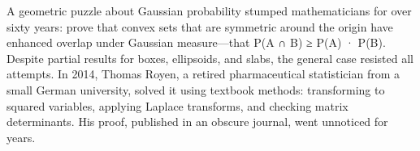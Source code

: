 A geometric puzzle about Gaussian probability stumped mathematicians for over sixty years: prove that convex sets that are symmetric around the origin have enhanced overlap under Gaussian measure—that P(A ∩ B) ≥ P(A) · P(B). Despite partial results for boxes, ellipsoids, and slabs, the general case resisted all attempts. In 2014, Thomas Royen, a retired pharmaceutical statistician from a small German university, solved it using textbook methods: transforming to squared variables, applying Laplace transforms, and checking matrix determinants. His proof, published in an obscure journal, went unnoticed for years. 
